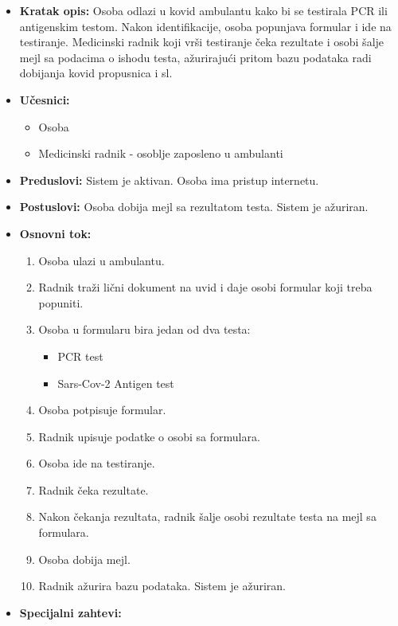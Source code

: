 \documentclass[titlepage]{article}
\begin{document}
\begin{itemize}
    \item \textbf{Kratak opis:} Osoba odlazi u kovid ambulantu kako bi se testirala PCR ili antigenskim testom. Nakon identifikacije, osoba popunjava formular i ide na testiranje. Medicinski radnik koji vrši testiranje čeka rezultate i osobi šalje mejl sa podacima o ishodu testa, ažurirajući pritom bazu podataka radi dobijanja kovid propusnica i sl.
    \item \textbf{Učesnici:}
        \begin{itemize}
            \item Osoba
            \item Medicinski radnik - osoblje zaposleno u ambulanti
        \end{itemize}
    \item \textbf{Preduslovi:} Sistem je aktivan. Osoba ima pristup internetu.
    \item \textbf{Postuslovi:} Osoba dobija mejl sa rezultatom testa. Sistem je ažuriran.
    \item \textbf{Osnovni tok:}
        \begin{enumerate}
           \item Osoba ulazi u ambulantu.
           \item Radnik traži lični dokument na uvid i daje osobi formular koji treba popuniti. \item Osoba u formularu bira jedan od dva testa:
           \begin{itemize}
               \item PCR test
               \item Sars-Cov-2 Antigen test
           \end{itemize}
           \item Osoba potpisuje formular.
           \item Radnik upisuje podatke o osobi sa formulara.
           \item Osoba ide na testiranje.
           \item Radnik čeka rezultate.
           \item Nakon čekanja rezultata, radnik šalje osobi rezultate testa na mejl sa formulara.
           \item Osoba dobija mejl.
           \item Radnik ažurira bazu podataka. Sistem je ažuriran.
        \end{enumerate}
    \item \textbf{Specijalni zahtevi:}

\end{itemize}
\end{document}
